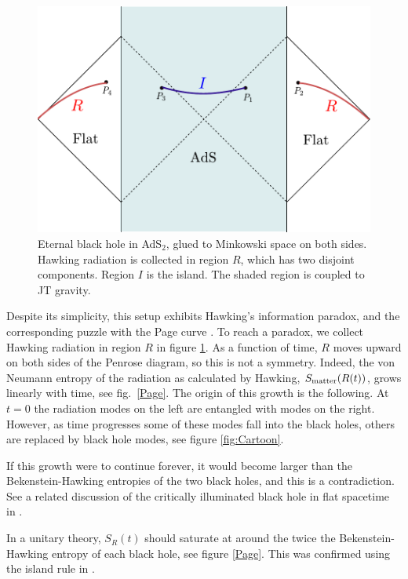 \begin{figure}
\begin{center}
\includegraphics[scale=0.6]{figures/eternalBH-lorentzian.pdf}
\end{center}
\caption{Eternal black hole in AdS$_2$, glued to Minkowski space on both sides. Hawking radiation is collected in region $R$, which has two disjoint components. Region $I$ is the island. The shaded region is coupled to JT gravity. 
} 
\label{fig:eternalBH-lorentzian}
\end{figure}

Despite its simplicity, this setup exhibits Hawking's information paradox, and the corresponding puzzle with the Page curve \cite{Page:1993wv,Page:2013dx}. To reach a paradox, we collect Hawking radiation in region $R$ in figure
\ref{fig:eternalBH-lorentzian}. As a function of time, $R$ moves upward on both sides of the Penrose diagram, so this is not a symmetry. Indeed, the von Neumann entropy of the radiation as calculated by Hawking, $S_{\rm matter}(R(t))$, grows linearly with time, see fig.~\ref{Page}. 
 The origin of this growth is the following. At $t=0$ the radiation modes on the left are entangled with modes on the right. However, as time progresses some of these modes fall into the black holes, others are replaced by black hole modes, see figure 
\ref{fig:Cartoon}. 

If this growth were to continue forever,  it would become larger  than the 
 Bekenstein-Hawking entropies of the two black holes, and this is a contradiction.  See a related discussion 
 of the critically illuminated black hole in flat spacetime in \cite{Fiola:1994ir}. 
 
In a unitary theory, $S_R(t)$ should saturate at around the twice the  Bekenstein-Hawking entropy of each black hole, see figure \ref{Page}. This was confirmed using the island rule in \cite{Almheiri:2019yqk}.

